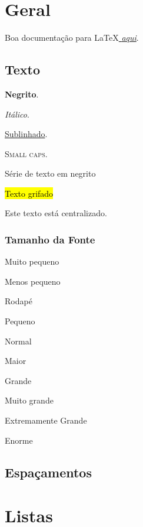 \section{Geral}
\label{sec: texto}

Boa documentação para \LaTeX \href{https://en.wikibooks.org/wiki/LaTeX}{\textit{ aqui}}.

\subsection{Texto}

\textbf{Negrito}.

\textit{Itálico}.

\underline{Sublinhado}.

\textsc{Small caps}.

\begin{bfseries}
Série de texto em negrito
\end{bfseries}

\hl{Texto grifado}

\begin{center}
Este texto está centralizado.
\end{center}

\subsubsection{Tamanho da Fonte}

\tiny
Muito pequeno

\scriptsize
Menos pequeno

\footnotesize
Rodapé

\small
Pequeno

\normalsize
Normal

\large
Maior

\Large
Grande

\LARGE
Muito grande

\huge
Extremamente Grande

\Huge
Enorme

\normalsize


\subsection{Espaçamentos}

\hspace{1cm}
\vspace{1cm}

\section{Listas}

